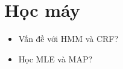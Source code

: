 \chapter{Học máy}

\begin{itemize}
  \item Vấn đề với HMM và CRF?
  \item Học MLE và MAP?
\end{itemize}

